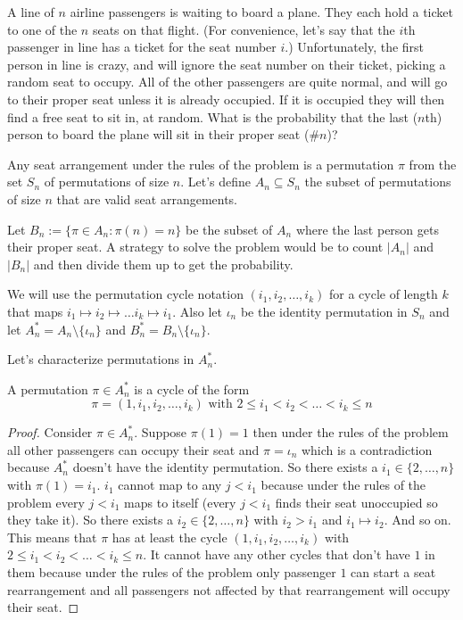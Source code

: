
\vspace{10 mm}
\begin{problem}
 A line of $n$ airline passengers is waiting to board a plane. They each hold a ticket to one of the $n$ seats on that flight. (For convenience, let's say that the $i$th passenger in line has a ticket for the seat number $i$.) Unfortunately, the first person in line is crazy, and will ignore the seat number on their ticket, picking a random seat to occupy. All of the other passengers are quite normal, and will go to their proper seat unless it is already occupied. If it is occupied they will then find a free seat to sit in, at random. What is the probability that the last ($n$th)
person to board the plane will sit in their proper seat (\#$n$)?
\end{problem}

Any seat arrangement under the rules of the problem is a permutation $\pi$ from the set $S_n$ of permutations of size $n$. Let's define $A_n \subseteq S_n$ the subset of permutations of size $n$ that are valid seat arrangements. 

Let $B_n := \{\pi \in A_n: \pi(n) = n\}$ be the subset of $A_n$ where the last person gets their proper seat. A strategy to solve the problem would be to count $|A_n|$ and $|B_n|$ and then divide them up to get the probability. 

We will use the permutation cycle notation $(i_1,i_2,\ldots,i_k)$ for a cycle of length $k$ that maps $i_1 \mapsto i_2 \mapsto \ldots i_k\mapsto i_1$. Also let $\iota_n$ be the identity permutation in $S_n$ and let $A_n^* = A_n \setminus \{\iota_n\}$ and $B_n^* = B_n \setminus \{\iota_n\}$.

Let's characterize permutations in $A_n^*$.

\begin{lem}\label{a_n}
A permutation $\pi \in A_n^*$ is a cycle of the form
\begin{equation*}
\pi = (1, i_1, i_2,\ldots, i_k)  \text{ with } 2 \leq i_1 < i_2 < \ldots < i_k \leq n
\end{equation*}  
\end{lem}

\begin{proof}

Consider $\pi \in A_n^*$. Suppose $\pi(1) = 1$ then under the rules of the problem all other passengers can occupy their seat and $\pi =\iota_n$ which is a contradiction because $A_n^*$ doesn't have the identity permutation. So there exists a $i_1 \in \{2,\ldots,n\}$ with $\pi(1) = i_1$.  $i_1$ cannot map to any $j  <  i_1$ because under the rules of the problem every $j  < i_1$ maps to itself (every $j < i_1$ finds their seat unoccupied so they take it). So there exists a $i_2 \in \{2,\ldots,n\}$ with $i_2 >i_1$ and $i_1 \mapsto i_2$. And so on. This means that $\pi$ has at least the cycle $(1, i_1, i_2,\ldots, i_k)$ with $2 \leq i_1 < i_2 < \ldots < i_k \leq n$. It cannot have any other cycles that don't have $1$ in them because under the rules of the problem only passenger $1$ can start a seat rearrangement and all passengers not affected by that rearrangement will occupy their seat. 

\end{proof}

